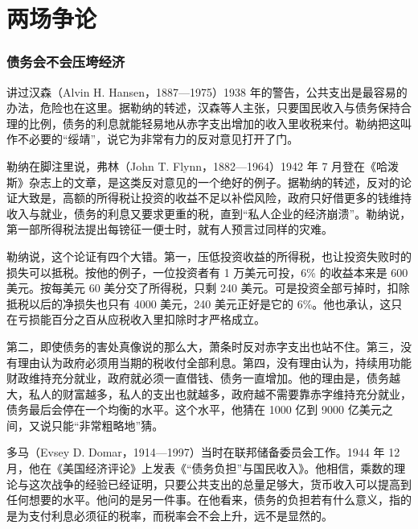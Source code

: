 \section{两场争论}\label{sec:warfinance-debate}

\subsubsection{债务会不会压垮经济}
讲过汉森（Alvin H. Hansen，1887—1975）1938 年的警告，公共支出是最容易的办法，危险也在这里\cite{hansen1939,loc33}。据勒纳的转述，汉森等人主张，只要国民收入与债务保持合理的比例，债务的利息就能轻易地从赤字支出增加的收入里收税来付\cite{lerner1943}。勒纳把这叫作不必要的“绥靖”，说它为非常有力的反对意见打开了门\cite{lerner1943}。

勒纳在脚注里说，弗林（John T. Flynn，1882—1964）1942 年 7 月登在《哈泼斯》杂志上的文章，是这类反对意见的一个绝好的例子\cite{lerner1943,loc34}。据勒纳的转述，反对的论证大致是，高额的所得税让投资的收益不足以补偿风险，政府只好借更多的钱维持收入与就业，债务的利息又要求更重的税，直到“私人企业的经济崩溃”\cite{lerner1943}。勒纳说，第一部所得税法提出每镑征一便士时，就有人预言过同样的灾难\cite{lerner1943}。

勒纳说，这个论证有四个大错\cite{lerner1943}。第一，压低投资收益的所得税，也让投资失败时的损失可以抵税。按他的例子，一位投资者有 1 万美元可投，6\% 的收益本来是 600 美元。按每美元 60 美分交了所得税，只剩 240 美元\cite{lerner1943}。可是投资全部亏掉时，扣除抵税以后的净损失也只有 4000 美元，240 美元正好是它的 6\%\cite{lerner1943}。他也承认，这只在亏损能百分之百从应税收入里扣除时才严格成立\cite{lerner1943}。

第二，即使债务的害处真像说的那么大，萧条时反对赤字支出也站不住\cite{lerner1943}。第三，没有理由认为政府必须用当期的税收付全部利息\cite{lerner1943}。第四，没有理由认为，持续用功能财政维持充分就业，政府就必须一直借钱、债务一直增加\cite{lerner1943}。他的理由是，债务越大，私人的财富越多，私人的支出也就越多，政府越不需要靠赤字维持充分就业，债务最后会停在一个均衡的水平\cite{lerner1943}。这个水平，他猜在 1000 亿到 9000 亿美元之间，又说只能“非常粗略地”猜\cite{lerner1943}。

多马（Evsey D. Domar，1914—1997）当时在联邦储备委员会工作\cite{domar1944,gnd34}。1944 年 12 月，他在《美国经济评论》上发表《“债务负担”与国民收入》\cite{domar1944}。他相信，乘数的理论与这次战争的经验已经证明，只要公共支出的总量足够大，货币收入可以提高到任何想要的水平\cite{domar1944}。他问的是另一件事。在他看来，债务的负担若有什么意义，指的是为支付利息必须征的税率，而税率会不会上升，远不是显然的\cite{domar1944}。

